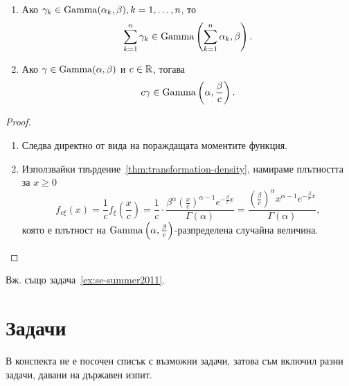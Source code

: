 \documentclass[numbers=endperiod, DIV=15, bibliography=totocnumbered]{scrartcl}
\begin{document}
\begin{proposition}\label{thm:gamma-operations}
  \mbox{}
  \begin{enumerate}
    \item Ако $\gamma_k \in \operatorname{Gamma}(\alpha_k, \beta), k = 1, \ldots, n$, то
    \begin{displaymath}
      \sum_{k=1}^n \gamma_k \in \operatorname{Gamma}\left( \sum_{k=1}^n \alpha_k, \beta \right).
    \end{displaymath}

    \item Ако $\gamma \in \operatorname{Gamma}(\alpha, \beta)$ и $c \in \mathbb{R}$, тогава
    \begin{displaymath}
      c \gamma \in \operatorname{Gamma}\left(\alpha, \frac \beta c \right).
    \end{displaymath}
  \end{enumerate}
\end{proposition}
\begin{proof}
  \mbox{}
  \begin{enumerate}
    \item Следва директно от вида на пораждащата моментите функция.
    \item Използвайки твърдение~\ref{thm:transformation-density}, намираме плътността за $x \geq 0$
    \begin{displaymath}
      f_{c\xi}(x)
      =
      \frac 1 c f_\xi\left(\frac x c \right)
      =
      \frac 1 c \cdot \frac {\beta^\alpha {\left(\frac x c \right)}^{\alpha-1} e^{-\frac \beta c x}} {\Gamma(\alpha)}
      =
      \frac {{\left(\frac \beta c \right)}^\alpha x^{\alpha-1} e^{-\frac \beta c x}} {\Gamma(\alpha)},
    \end{displaymath}
    която е плътност на $\operatorname{Gamma}\left(\alpha, \frac \beta c \right)$-разпределена случайна величина.
  \end{enumerate}
\end{proof}

Вж. също задача~\ref{ex:se-summer2011}.

\section{Задачи}

В конспекта не е посочен списък с възможни задачи, затова съм включил разни задачи, давани на държавен изпит.
\end{document}
